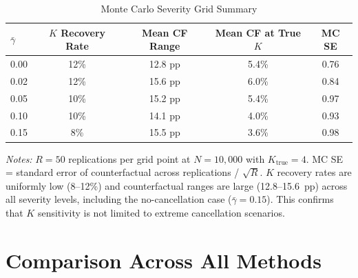 \documentclass[12pt]{article}
\begin{document}
\begin{table}[H]
\centering
\caption{Monte Carlo Severity Grid Summary}
\label{tab:severity_summary}
\begin{threeparttable}
\begin{tabular}{lcccc}
\toprule
$\bar{\gamma}$ & $K$ Recovery Rate & Mean CF Range & Mean CF at True $K$ & MC SE \\
\midrule
0.00 & 12\% & 12.8 pp & 5.4\% & 0.76 \\
0.02 & 12\% & 15.6 pp & 6.0\% & 0.84 \\
0.05 & 10\% & 15.2 pp & 5.4\% & 0.97 \\
0.10 & 10\% & 14.1 pp & 4.0\% & 0.93 \\
0.15 &  8\% & 15.5 pp & 3.6\% & 0.98 \\
\bottomrule
\end{tabular}
\begin{tablenotes}
\small
\item \textit{Notes:} $R = 50$ replications per grid point at $N = 10{,}000$ with $K_{\text{true}} = 4$. MC SE = standard error of counterfactual across replications / $\sqrt{R}$. $K$ recovery rates are uniformly low (8--12\%) and counterfactual ranges are large (12.8--15.6~pp) across all severity levels, including the no-cancellation case ($\bar{\gamma} = 0.15$). This confirms that $K$ sensitivity is not limited to extreme cancellation scenarios.
\end{tablenotes}
\end{threeparttable}
\end{table}


\section{Comparison Across All Methods}
\label{app:comparison}
\end{document}
